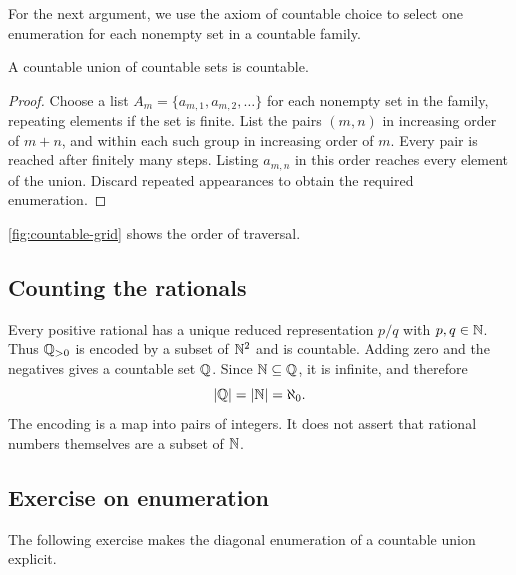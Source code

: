For the next argument, we use the axiom of countable choice to select
one enumeration for each nonempty set in a countable family.
\begin{proposition}
  A countable union of countable sets is countable.
\end{proposition}
\begin{proof}
  Choose a list $A_m=\{a_{m,1},a_{m,2},\ldots\}$ for each nonempty set
  in the family, repeating elements if the set is finite. List the pairs
  $(m,n)$ in increasing order of $m+n$, and within each such group in
  increasing order of $m$. Every pair is reached after finitely many steps.
  Listing $a_{m,n}$ in this order reaches every element of the union.
  Discard repeated appearances to obtain the required enumeration.
\end{proof}
\autoref{fig:countable-grid} shows the order of traversal.
\begin{marginfigure}[-6\baselineskip]
  \centering
  
  \caption[Enumerating pairs along diagonals.]{Visit pairs along finite diagonals. The numerals indicate the
    order of the first ten pairs.}
  \label{fig:countable-grid}
\end{marginfigure}

\subsection{Counting the rationals}
Every positive rational has a unique reduced representation $p/q$ with
$p,q\in\mathbb{N}$. Thus $\mathbb{Q}_{>0}$ is encoded by a subset of $\mathbb{N}^2$ and is
countable. Adding zero and the negatives gives a countable set $\mathbb{Q}$.
Since $\mathbb{N}\subseteq\mathbb{Q}$, it is infinite, and therefore
\[
  |\mathbb{Q}|=|\mathbb{N}|=\aleph_0.
\]
The encoding is a map into pairs of integers. It does not assert that
rational numbers themselves are a subset of $\mathbb{N}$.

\subsection{Exercise on enumeration}
The following exercise makes the diagonal enumeration of a countable
union explicit.


